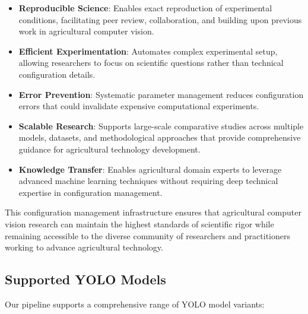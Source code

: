 \begin{itemize}
    \item \textbf{Reproducible Science}: Enables exact reproduction of experimental conditions, facilitating peer review, collaboration, and building upon previous work in agricultural computer vision.
    
    \item \textbf{Efficient Experimentation}: Automates complex experimental setup, allowing researchers to focus on scientific questions rather than technical configuration details.
    
    \item \textbf{Error Prevention}: Systematic parameter management reduces configuration errors that could invalidate expensive computational experiments.
    
    \item \textbf{Scalable Research}: Supports large-scale comparative studies across multiple models, datasets, and methodological approaches that provide comprehensive guidance for agricultural technology development.
    
    \item \textbf{Knowledge Transfer}: Enables agricultural domain experts to leverage advanced machine learning techniques without requiring deep technical expertise in configuration management.
\end{itemize}

This configuration management infrastructure ensures that agricultural computer vision research can maintain the highest standards of scientific rigor while remaining accessible to the diverse community of researchers and practitioners working to advance agricultural technology.

\subsection{Supported YOLO Models}

Our pipeline supports a comprehensive range of YOLO model variants:

